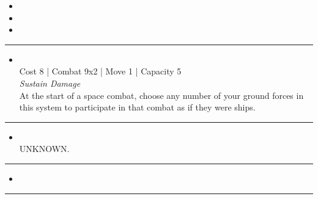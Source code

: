 \begin{multicols}{2}

\begin{itemize}
\item \deaxive
\item {}
\item {}
\end{itemize}

\vspace{-10pt}\rule{\hsize}{0.4pt}\vspace{5pt}


\begin{itemize}
\item {}\\
Cost 8 | Combat 9x2 | Move 1 | Capacity 5 \\
\emph{Sustain Damage}\\
At the start of a space combat, choose any number of your ground forces in this system to participate in that combat as if they were ships.
\end{itemize}

\vspace{-10pt}\rule{\hsize}{0.4pt}\vspace{5pt}


\begin{itemize}
\item {} 
\\
UNKNOWN.
\end{itemize}

\vspace{-10pt}\rule{\hsize}{0.4pt}\vspace{5pt}

\nounits

\columnbreak
{}

\begin{itemize}
\item \valefar
\end{itemize}

\vspace{-10pt}\rule{\hsize}{0.4pt}\vspace{5pt}



\end{multicols}
